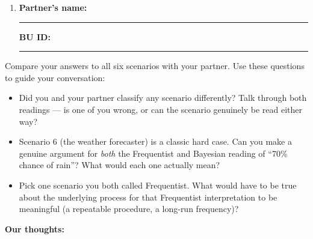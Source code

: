 \documentclass{article}
\newcommand{\nameblank}{\rule{1.75in}{0.4pt}}
\newcommand{\idblank}{\rule{1.55in}{0.4pt}}
\begin{document}
\begin{enumerate}[label=\arabic*.,leftmargin=*,itemsep=.7em, start=2]
  \item \textbf{Partner's name:} \nameblank \hfill \textbf{BU ID:} \idblank
\end{enumerate}

Compare your answers to all six scenarios with your partner. Use these questions to guide your conversation:

\begin{itemize}
  \item Did you and your partner classify any scenario differently? Talk through both readings --- is one of you wrong, or can the scenario genuinely be read either way?
  \item Scenario 6 (the weather forecaster) is a classic hard case. Can you make a genuine argument for \emph{both} the Frequentist and Bayesian reading of ``70\% chance of rain''? What would each one actually mean?
  \item Pick one scenario you both called Frequentist. What would have to be true about the underlying process for that Frequentist interpretation to be meaningful (a repeatable procedure, a long-run frequency)?
\end{itemize}

\textbf{Our thoughts:}
\vfill
\end{document}
